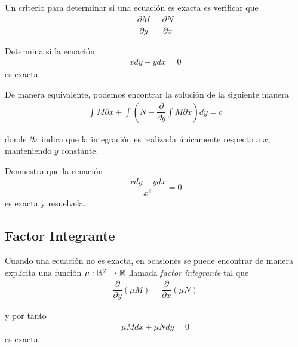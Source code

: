{}
Un criterio para determinar si una ecuación es exacta es verificar que
\begin{align*}
    \dfrac{\partial M}{\partial y}= \dfrac{\partial N}{\partial x}
    \end{align*}



	\begin{resuelto}
		Determina si la ecuación
		\begin{align*}
			xdy-ydx=0
		\end{align*}
		es exacta.
	\end{resuelto}

{}
  De manera equivalente, podemos encontrar la solución de la siguiente manera
  \begin{align*}
   \displaystyle \int M\partial x+ \int \left( N - \dfrac{\partial }{\partial y}\int M\partial x \right)dy = c
   \end{align*}

   donde \emph{$\partial x$} indica que la integración es realizada únicamente respecto a $x$, manteniendo $y$ constante.



	\begin{resuelto}
		Demuestra que la ecuación
		\begin{align*}
		\dfrac{xdy-ydx}{x^2}=0
		\end{align*}
		es exacta y resuelvela.
	\end{resuelto}

\subsection{Factor Integrante}
  Cuando una ecuación no es exacta, en ocasiones se puede encontrar de manera explícita una función $\mu:\mathbb{R}^{2}\to \mathbb{R}$ llamada \emph{factor integrante} tal que
\begin{align*}
 \dfrac{\partial }{\partial y}\left( \mu M \right) =
 \dfrac{\partial }{\partial x}\left( \mu N \right)
 \end{align*}

 y por tanto
 \begin{align*}
  \mu M dx + \mu N dy = 0
  \end{align*}
  es exacta.


